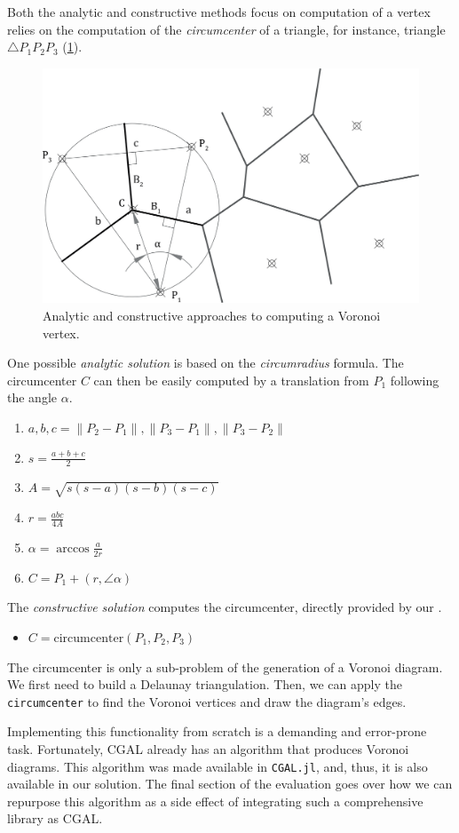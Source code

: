 Both the analytic and constructive methods focus on computation of a vertex
relies on the computation of the \textit{circumcenter} of a triangle, for
instance, triangle $\triangle P_1 P_2 P_3$
(\cref{fig:eval.studies.voronoi.sol}).

\begin{figure}[htb]
  \centering
  \includegraphics[width=.7\linewidth]{fig/voronoi-solution}
  \caption{\label{fig:eval.studies.voronoi.sol}
    Analytic and constructive approaches to computing a Voronoi vertex.}%
\end{figure}

One possible \textit{analytic solution} is based on the \textit{circumradius}
formula.  The circumcenter $C$ can then be easily computed by a translation from
$P_1$ following the angle $\alpha$.

\begin{enumerate}
  \item $a, b, c = \lVert P_2 - P_1 \rVert, \lVert P_3 - P_1 \rVert, \lVert P_3
  - P_2 \rVert$
  \item $s = \frac{a + b + c}{2}$
  \item $A = \sqrt{s(s - a)(s - b)(s - c)}$
  \item $r = \frac{abc}{4A}$
  \item $\alpha = \arccos\frac{a}{2r}$
  \item $C = P_1 + \left(r, \angle\alpha\right)$
\end{enumerate}

The \textit{constructive solution} computes the circumcenter, directly provided
by our \primitives{}.

\begin{itemize}
  \item[] $C = \mathrm{circumcenter}\left(P_1, P_2, P_3\right)$
\end{itemize}

The circumcenter is only a sub-problem of the generation of a Voronoi diagram.
We first need to build a Delaunay triangulation.  Then, we can apply the
\texttt{circumcenter} to find the Voronoi vertices and draw the diagram's edges.

Implementing this functionality from scratch is a demanding and error-prone
task.  Fortunately, \ac{CGAL} already has an algorithm that produces Voronoi
diagrams.  This algorithm was made available in \texttt{CGAL.jl},
and, thus, it is also available in our solution.  The final section of the
evaluation goes over how we can repurpose this algorithm as a side effect of
integrating such a comprehensive library as \ac{CGAL}.
